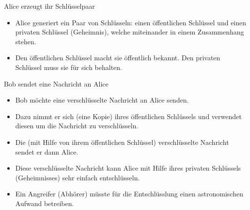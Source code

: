 %
%

\begin{frame}[t]{Alice erzeugt ihr Schlüsselpaar}
	\begin{itemize}
		\item Alice generiert ein Paar von Schlüsseln: einen öffentlichen Schlüssel und einen privaten Schlüssel (Geheimnis), welche miteinander in einem Zusammenhang stehen.
		\item Den öffentlichen Schlüssel macht sie öffentlich bekannt. Den privaten Schlüssel muss sie für sich behalten.
	\end{itemize}
\end{frame}

\begin{frame}[t]{Bob sendet eine Nachricht an Alice}
	\small
	\begin{itemize}
		\item Bob möchte eine verschlüsselte Nachricht an Alice senden.
		\item Dazu nimmt er sich (eine Kopie) ihres öffentlichen Schlüssels und verwendet diesen um die Nachricht zu verschlüsseln.
		\item Die (mit Hilfe von ihrem öffentlichen Schlüssel) verschlüsselte Nachricht sendet er dann Alice.
		\item Diese verschlüsselte Nachricht kann Alice mit Hilfe ihres privaten Schlüssels (Geheimnisses) sehr einfach entschlüsseln.
		\item Ein Angreifer (Abhörer) müsste für die Entschlüsslung einen astronomischen Aufwand betreiben.
	\end{itemize}
\end{frame}

